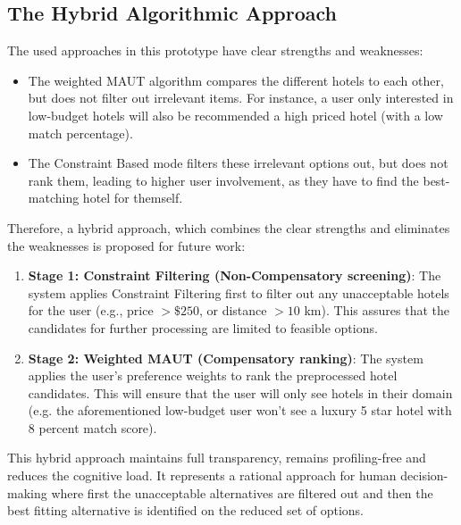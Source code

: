 \documentclass[acmlarge]{acmart}
\begin{document}
\subsection{The Hybrid Algorithmic Approach}
The used approaches in this prototype have clear strengths and weaknesses:
\begin{itemize}
  \item The weighted MAUT algorithm compares the different hotels to each other, but does not filter out irrelevant items. For instance, a user only interested in low-budget hotels will also be recommended a high priced hotel (with a low match percentage).
  \item The Constraint Based mode filters these irrelevant options out, but does not rank them, leading to higher user involvement, as they have to find the best-matching hotel for themself.
\end{itemize}
Therefore, a hybrid approach, which combines the clear strengths and eliminates the weaknesses is proposed for future work:
\begin{enumerate}
  \item \textbf{Stage 1: Constraint Filtering (Non-Compensatory screening)}:
  The system applies Constraint Filtering first to filter out any unacceptable hotels for the user (e.g., price $> \$250$, or distance $> 10$ km). This assures that the candidates for further processing are limited to feasible options.
  \item \textbf{Stage 2: Weighted MAUT (Compensatory ranking)}: The system applies the user's preference weights to rank the preprocessed hotel candidates. This will ensure that the user will only see hotels in their domain (e.g. the aforementioned low-budget user won't see a luxury 5 star hotel with 8 percent match score).
\end{enumerate}
This hybrid approach maintains full transparency, remains profiling-free and reduces the cognitive load. It represents a rational approach for human decision-making where first the unacceptable alternatives are filtered out and then the best fitting alternative is identified on the reduced set of options.
\end{document}
